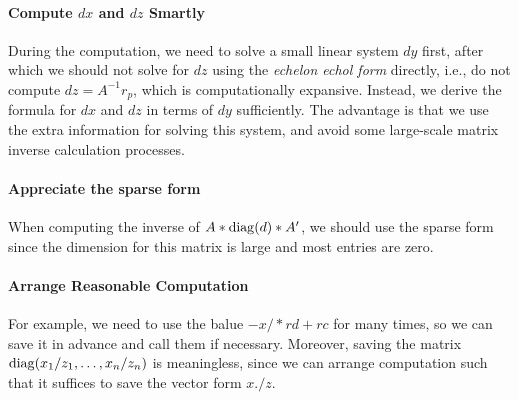 \paragraph{Compute $dx$ and $dz$ Smartly}
During the computation, we need to solve a small linear system $dy$ first, after which we should not solve for $dz$ using the \emph{echelon echol form} directly, i.e., do not compute $dz=A^{-1}r_p$, which is computationally expansive. Instead, we derive the formula for $dx$ and $dz$ in terms of $dy$ sufficiently. The advantage is that we use the extra information for solving this system, and avoid some large-scale matrix inverse calculation processes. 
\paragraph{Appreciate the sparse form}
When computing the inverse of $A*\operatorname{diag}(d)*A'$, we should use the sparse form since the dimension for this matrix is large and most entries are zero.
\paragraph{Arrange Reasonable Computation}
For example, we need to use the balue $-x/*rd+rc$ for many times, so we can save it in advance and call them if necessary. Moreover, saving the matrix $\operatorname{diag}(x_1/z_1,\dots,x_n/z_n)$ is meaningless, since we can arrange computation such that it suffices to save the vector form $x./z$.












